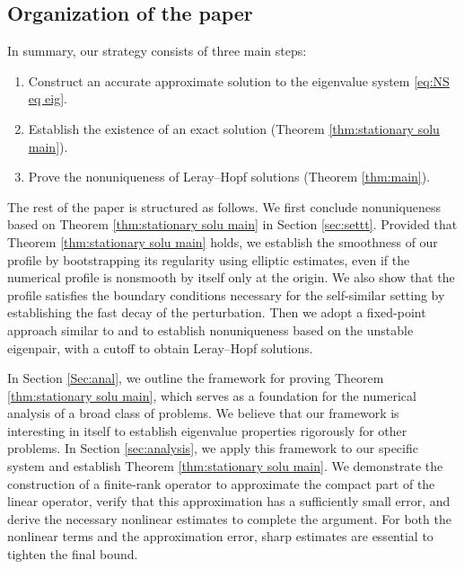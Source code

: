 \documentclass[11pt,a4paper]{article}
\numberwithin{equation}{section}
\begin{document}
\subsection{Organization of the paper}
In summary, our strategy consists of three main steps:
\begin{enumerate}
  \item Construct an accurate approximate solution to the eigenvalue system \eqref{eq:NS eq eig}. %
  
  \item Establish the existence of an exact solution (Theorem
  \ref{thm:stationary solu main}).
  
  \item Prove the nonuniqueness of Leray--Hopf solutions (Theorem
  \ref{thm:main}). 
\end{enumerate}
The rest of the paper is structured as follows.  We first conclude nonuniqueness based on Theorem \ref{thm:stationary solu main} in Section \ref{sec:settt}. Provided that Theorem \ref{thm:stationary solu main} holds, we establish the smoothness of our profile by bootstrapping its regularity using elliptic estimates, even if the numerical profile is nonsmooth by itself only at the origin. We also show that the profile satisfies the boundary conditions necessary for the self-similar setting by establishing the fast decay of the perturbation. Then we adopt a fixed-point approach similar to \cite{albritton2022non} and \cite{jia2015incompressible} to establish nonuniqueness based on the unstable eigenpair, with a cutoff to obtain Leray--Hopf solutions.



In Section \ref{Sec:anal}, we outline the
framework for proving Theorem \ref{thm:stationary solu main}, which serves as a
foundation for the numerical analysis of a broad class of problems.  We believe that our framework is interesting in itself to establish eigenvalue properties rigorously for other problems.
In Section \ref{sec:analysis}, we apply this framework to our specific
system and establish Theorem \ref{thm:stationary solu main}. We demonstrate the construction of a finite-rank operator to
approximate the compact part of the linear operator, verify that this
approximation has a sufficiently small error, and derive the necessary
nonlinear estimates to complete the argument. For both the nonlinear terms and the
approximation error, sharp estimates are essential to tighten the final bound.
\end{document}
